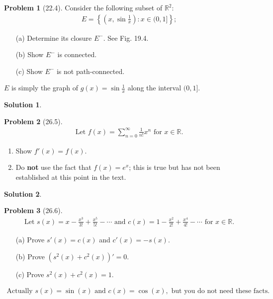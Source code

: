 \documentclass[12pt]{article}
\theoremstyle{definition} %
\newtheorem{solution}{Solution}
\newtheorem{problem}{Problem}
\theoremstyle{plain} %
\begin{document}
\begin{problem}[22.4]
        Consider the following subset of $\mathbb{R}^2$: 
    \begin{align}
        E = \left\{ \left( x, \sin\frac{1}{x} \right) : x \in (0, 1] \right\};
    \end{align}
    \begin{enumerate}
        \item[(a)] Determine its closure $ E^- $. See Fig. 19.4.
        \item[(b)] Show $ E^- $ is connected.
        \item[(c)] Show $ E^- $ is not path-connected.
    \end{enumerate}
        $E$ is simply the graph of $g(x) = \sin\frac{1}{x}$ along the interval $(0, 1]$.
\end{problem}
\begin{solution}
\end{solution}
\begin{problem}[26.5]
    \begin{align}
        \text{Let } f(x) = \sum_{n=0}^\infty \frac{1}{n!} x^n \text{ for } x \in \mathbb{R}.
    \end{align}
    \begin{enumerate}
        \item Show $ f'(x) = f(x) $.
        \item Do \textbf{not} use the fact that $ f(x) = e^x $; this is true but has not been established at this point in the text.
    \end{enumerate}
\end{problem}
\begin{solution}
    
\end{solution}
\begin{problem}[26.6]
    \begin{align}
        \text{Let } s(x) = x - \frac{x^3}{3!} + \frac{x^5}{5!} - \cdots \text{ and } c(x) = 1 - \frac{x^2}{2!} + \frac{x^4}{4!} - \cdots \text{ for } x \in \mathbb{R}.
    \end{align}
    \begin{enumerate}
        \item[(a)] Prove $ s'(x) = c(x) $ and $ c'(x) = -s(x) $.
        \item[(b)] Prove $ (s^2(x) + c^2(x))' = 0 $.
        \item[(c)] Prove $ s^2(x) + c^2(x) = 1 $.
    \end{enumerate}
    \begin{align}
        \text{Actually } s(x) = \sin(x) \text{ and } c(x) = \cos(x), \text{ but you do not need these facts.}
    \end{align}
\end{problem}
\end{document}
